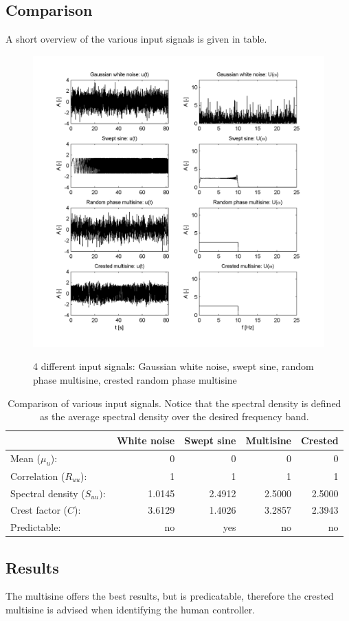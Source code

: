 \subsection{Comparison}
A short overview of the various input signals is given in table.
		\begin{figure}
			\centering
				\includegraphics{images/u}
			\label{fig:u}
			\caption{4 different input signals: Gaussian white noise, swept sine, random phase multisine, crested random phase multisine}
		\end{figure}
\begin{table}
		\centering
		\begin{tabular}{lrrrr}
		\toprule
																			& White noise & Swept sine & Multisine & Crested  \\
		\midrule
		Mean ($\mu_u$):					& 0 & 0 & 0 & 0 \\
		Correlation ($R_{uu}$):	& 1 & 1 & 1 & 1 \\
		Spectral density ($S_{uu}):$ 										& 1.0145 &   2.4912  &  2.5000  &  2.5000 \\
		Crest factor ($C$): 						& 3.6129   & 1.4026  &  3.2857   & 2.3943 \\
		Predictable: 								& no & yes & no & no \\
		\bottomrule
		\end{tabular}
		\label{table:u}
		\caption{Comparison of various input signals. Notice that the spectral density is defined as the average spectral density over the desired frequency band.}
\end{table}
\subsection{Results}
The multisine offers the best results, but is predicatable, therefore the crested multisine is advised when identifying  the human controller.